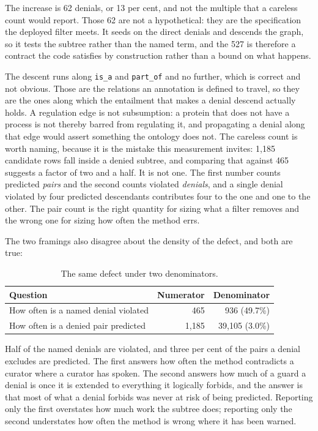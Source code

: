 The increase is 62 denials, or 13 per cent, and not the multiple that a careless count
would report. Those 62 are not a hypothetical: they are the specification the deployed
filter meets. It seeds on the direct denials and descends the graph, so it tests the
subtree rather than the named term, and the 527 is therefore a contract the code
satisfies by construction rather than a bound on what happens.

The descent runs along \texttt{is\_a} and \texttt{part\_of} and no further, which is
correct and not obvious. Those are the relations an annotation is defined to travel, so
they are the ones along which the entailment that makes a denial descend actually
holds. A regulation edge is not subsumption: a protein that does not have a process is
not thereby barred from regulating it, and propagating a denial along that edge would
assert something the ontology does not. The careless count is worth naming, because it is the mistake this
measurement invites: 1{,}185 candidate rows fall inside a denied subtree, and comparing
that against 465 suggests a factor of two and a half. It is not one. The first number
counts predicted \emph{pairs} and the second counts violated \emph{denials}, and a
single denial violated by four predicted descendants contributes four to the one and one
to the other. The pair count is the right quantity for sizing what a filter removes and
the wrong one for sizing how often the method errs.

The two framings also disagree about the density of the defect, and both are true:

\begin{table}[htbp]
\centering
\caption{The same defect under two denominators.}
\label{tab:exp16-density}
\begin{tabular}{lrr}
\toprule
Question & Numerator & Denominator \\
\midrule
How often is a named denial violated & 465 & 936 \quad (49.7\%) \\
How often is a denied pair predicted & 1{,}185 & 39{,}105 \quad (3.0\%) \\
\bottomrule
\end{tabular}
\end{table}

Half of the named denials are violated, and three per cent of the pairs a denial
excludes are predicted. The first answers how often the method contradicts a curator
where a curator has spoken. The second answers how much of a guard a denial is once it
is extended to everything it logically forbids, and the answer is that most of what a
denial forbids was never at risk of being predicted. Reporting only the first overstates
how much work the subtree does; reporting only the second understates how often the
method is wrong where it has been warned.

